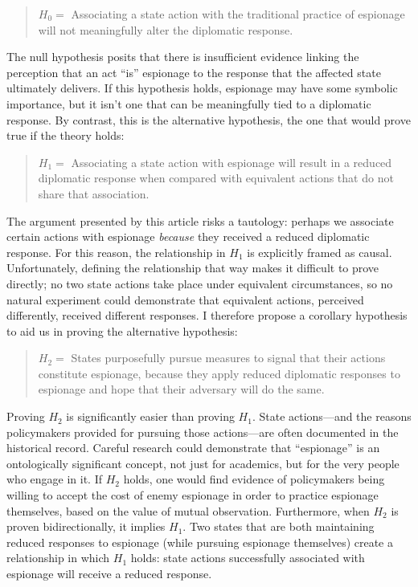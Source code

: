 \documentclass[12pt]{extarticle}
\begin{document}
\begin{quote}
$H_0 =$ Associating a state action with the traditional practice of espionage will not meaningfully alter the diplomatic response.
\end{quote}

The null hypothesis posits that there is insufficient evidence linking the perception that an act \enquote{is} espionage to the response that the affected state ultimately delivers. If this hypothesis holds, espionage may have some symbolic importance, but it isn't one that can be meaningfully tied to a diplomatic response. By contrast, this is the alternative hypothesis, the one that would prove true if the theory holds:

\begin{quote}
$H_1 =$ Associating a state action with espionage will result in a reduced diplomatic response when compared with equivalent actions that do not share that association.
\end{quote}

The argument presented by this article risks a tautology: perhaps we associate certain actions with espionage \emph{because} they received a reduced diplomatic response. For this reason, the relationship in $H_1$ is explicitly framed as causal. Unfortunately, defining the relationship that way makes it difficult to prove directly; no two state actions take place under equivalent circumstances, so no natural experiment could demonstrate that equivalent actions, perceived differently, received different responses. I therefore propose a corollary hypothesis to aid us in proving the alternative hypothesis:

\begin{quote}
$H_2 =$ States purposefully pursue measures to signal that their actions constitute espionage, because they apply reduced diplomatic responses to espionage and hope that their adversary will do the same.
\end{quote}

Proving $H_2$ is significantly easier than proving $H_1$. State actions---and the reasons policymakers provided for pursuing those actions---are often documented in the historical record. Careful research could demonstrate that \enquote{espionage} is an ontologically significant concept, not just for academics, but for the very people who engage in it. If $H_2$ holds, one would find evidence of policymakers being willing to accept the cost of enemy espionage in order to practice espionage themselves, based on the value of mutual observation. Furthermore, when $H_2$ is proven bidirectionally, it implies $H_1$. Two states that are both maintaining reduced responses to espionage (while pursuing espionage themselves) create a relationship in which $H_1$ holds: state actions successfully associated with espionage will receive a reduced response.
\end{document}
